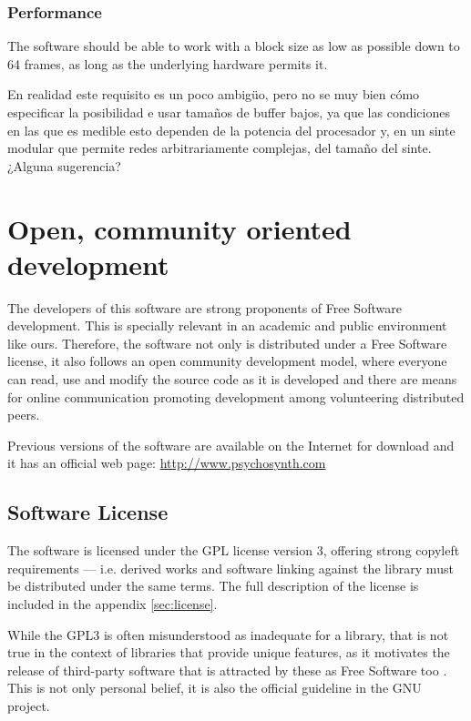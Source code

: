 \subsubsection{Performance}

\begin{requirement}[Latency]
  The software should be able to work with a block size as low as
  possible down to 64 frames, as long as the underlying hardware
  permits it.
\end{requirement}

\begin{todo}
  En realidad este requisito es un poco ambigüo, pero no se muy bien
  cómo especificar la posibilidad e usar tamaños de buffer bajos, ya
  que las condiciones en las que es medible esto dependen de la
  potencia del procesador y, en un sinte modular que permite redes
  arbitrariamente complejas, del tamaño del sinte. ¿Alguna sugerencia?
\end{todo}

\section{Open, community oriented development}

The developers of this software are strong proponents of Free Software
development. This is specially relevant in an academic and public
environment like ours. Therefore, the software not only is distributed
under a Free Software license, it also follows an open community
development model, where everyone can read, use and modify the
source code as it is developed and there are means for online
communication promoting development among volunteering distributed
peers.

Previous versions of the software are available on the Internet for
download and it has an official web page:
\url{http://www.psychosynth.com}

\subsection{Software License}

The software is licensed under the GPL license version 3, offering
strong copyleft requirements --- i.e. derived works and software
linking against the library must be distributed under the same
terms. The full description of the license is included in the appendix
\ref{sec:license}.

While the GPL3 is often misunderstood as inadequate for a library,
that is not true in the context of libraries that provide unique
features, as it motivates the release of third-party software that is
attracted by these as Free Software too \cite{gnu99why}. This is not
only personal belief, it is also the official guideline in the GNU
project.

